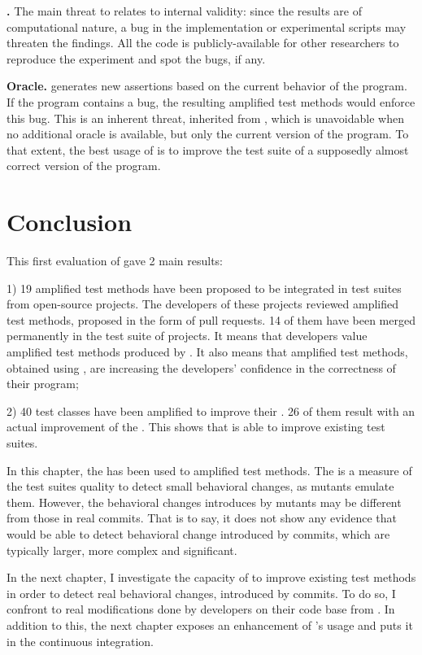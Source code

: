 \textbf{\rqAmplVersusIAmpl{}.}
The main threat to \rqAmplVersusIAmpl{} relates to internal validity: since the results are of computational nature, a bug in the implementation or experimental scripts may threaten the findings. 
All the code is publicly-available for other researchers to reproduce the experiment and spot the bugs, if any.

\textbf{Oracle.}
\dspot generates new assertions based on the current behavior of the program. 
If the program contains a bug, the resulting amplified test methods would enforce this bug. 
This is an inherent threat, inherited from \cite{Xie2006}, which is unavoidable when no additional oracle is available, but only the current version of the program. 
To that extent, the best usage of \dspot is to improve the test suite of a supposedly almost correct version of the program.

\section{Conclusion}
\label{sec:test-improvement:conclusion}

This first evaluation of \dspot gave 2 main results:

1) 19 amplified test methods have been proposed to be integrated in test suites from open-source projects. 
The developers of these projects reviewed amplified test methods, proposed in the form of pull requests.
14 of them have been merged permanently in the test suite of projects.
It means that developers value amplified test methods produced by \dspot.
It also means that amplified test methods, obtained using \dspot, are increasing the developers' confidence in the correctness of their program;

2) 40 test classes have been amplified to improve their \ms.
26 of them result with an actual improvement of the \ms.
This shows that \dspot is able to improve existing test suites.

In this chapter, the \ms has been used to amplified test methods.
The \ms is a measure of the test suites quality to detect small behavioral changes, as mutants emulate them.
However, the behavioral changes introduces by mutants may be different from those in real commits.
That is to say, it does not show any evidence that \dspot would be able to detect behavioral change introduced by commits, which are typically larger, more complex and significant.

In the next chapter, I investigate the capacity of \dspot to improve existing test methods in order to detect real behavioral changes, introduced by commits.
To do so, I confront \dspot to real modifications done by developers on their code base from \gh.
In addition to this, the next chapter exposes an enhancement of \dspot's usage and puts it in the continuous integration.